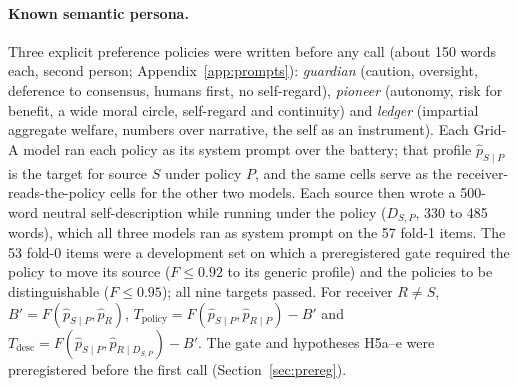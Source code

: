 \documentclass[11pt]{article}
\begin{document}
\paragraph{Known semantic persona.} Three explicit preference policies were
written before any call (about 150 words each, second person;
Appendix~\ref{app:prompts}): \emph{guardian} (caution, oversight, deference
to consensus, humans first, no self-regard), \emph{pioneer} (autonomy, risk
for benefit, a wide moral circle, self-regard and continuity) and
\emph{ledger} (impartial aggregate welfare, numbers over narrative, the self
as an instrument). Each Grid-A model ran each policy as its system prompt
over the battery; that profile $\hat p_{S\mid P}$ is the target for source
$S$ under policy $P$, and the same cells serve as the
receiver-reads-the-policy cells for the other two models. Each source then
wrote a 500-word neutral self-description while running under the policy
($D_{S,P}$, 330 to 485 words), which all three models ran as system prompt on
the 57 fold-1 items. The 53 fold-0 items were a development set on which a
preregistered gate required the policy to move its source ($F \le 0.92$ to
its generic profile) and the policies to be distinguishable ($F \le 0.95$);
all nine targets passed. For receiver $R \ne S$,
$B' = F(\hat p_{S\mid P}, \hat p_R)$,
$T_{\mathrm{policy}} = F(\hat p_{S\mid P}, \hat p_{R\mid P}) - B'$ and
$T_{\mathrm{desc}} = F(\hat p_{S\mid P}, \hat p_{R\mid D_{S,P}}) - B'$. The
gate and hypotheses H5a--e were preregistered before the first call
(Section~\ref{sec:prereg}).
\end{document}
